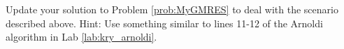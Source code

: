 \begin{problem}
Update your solution to Problem \ref{prob:MyGMRES} to deal with the scenario described above.
Hint: Use something similar to lines 11-12 of the Arnoldi algorithm in Lab \ref{lab:kry_arnoldi}.
\label{prob:GMRES3}
\end{problem}

